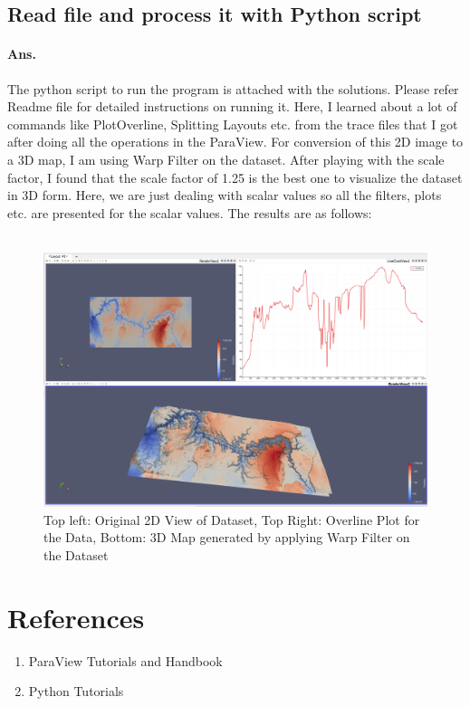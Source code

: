 \documentclass[a4paper,11pt]{article}
\theoremstyle{mytheor}
\begin{document}
\clearpage

\subsection{Read file and process it with Python script}
\paragraph{Ans.} The python script to run the program is attached with the solutions. Please refer Readme file for detailed instructions on running it. Here, I learned about a lot of commands like PlotOverline, Splitting Layouts etc. from the trace files that I got after doing all the operations in the ParaView. For conversion of this 2D image to a 3D map, I am using Warp Filter on the dataset. After playing with the scale factor, I found that the scale factor of 1.25 is the best one to visualize the dataset in 3D form. Here, we are just dealing with scalar values so all the filters, plots etc. are presented for the scalar values. The results are as follows: \\ \\ 
\begin{figure}[!h]
    \centering
    \includegraphics[scale = 0.53]{Q6.PNG}
    \caption{Top left: Original 2D View of Dataset, Top Right: Overline Plot for the Data, Bottom: 3D Map generated by applying Warp Filter on the Dataset }
\end{figure}
\clearpage
\section{References}
\begin{enumerate}
    \item ParaView Tutorials and Handbook
    \item Python Tutorials
\end{enumerate}
\end{document}

